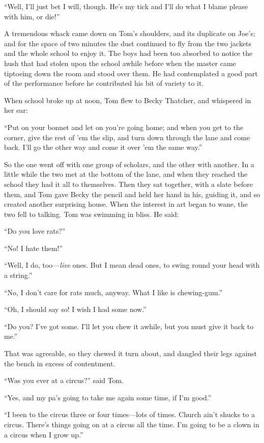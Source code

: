 \documentclass{book}
\begin{document}
“Well, I’ll just bet I will, though. He’s my tick and I’ll do what I blame please with him, or die!”

A tremendous whack came down on Tom’s shoulders, and its duplicate on Joe’s; and for the space of two minutes the dust continued to fly from the two jackets and the whole school to enjoy it. The boys had been too absorbed to notice the hush that had stolen upon the school awhile before when the master came tiptoeing down the room and stood over them. He had contemplated a good part of the performance before he contributed his bit of variety to it.

When school broke up at noon, Tom flew to Becky Thatcher, and whispered in her ear:

“Put on your bonnet and let on you’re going home; and when you get to the corner, give the rest of ’em the slip, and turn down through the lane and come back. I’ll go the other way and come it over ’em the same way.”

So the one went off with one group of scholars, and the other with another. In a little while the two met at the bottom of the lane, and when they reached the school they had it all to themselves. Then they sat together, with a slate before them, and Tom gave Becky the pencil and held her hand in his, guiding it, and so created another surprising house. When the interest in art began to wane, the two fell to talking. Tom was swimming in bliss. He said:

“Do you love rats?”

“No! I hate them!”

“Well, I do, too—\emph{live} ones. But I mean dead ones, to swing round your head with a string.”

“No, I don’t care for rats much, anyway. What I like is chewing-gum.”

“Oh, I should say so! I wish I had some now.”

“Do you? I’ve got some. I’ll let you chew it awhile, but you must give it back to me.”

That was agreeable, so they chewed it turn about, and dangled their legs against the bench in excess of contentment.

“Was you ever at a circus?” said Tom.

“Yes, and my pa’s going to take me again some time, if I’m good.”

“I been to the circus three or four times—lots of times. Church ain’t shucks to a circus. There’s things going on at a circus all the time. I’m going to be a clown in a circus when I grow up.”
\end{document}

